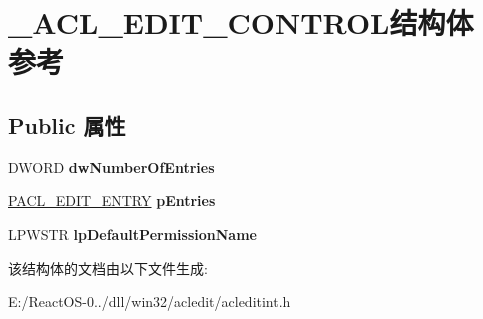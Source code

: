 \hypertarget{struct___a_c_l___e_d_i_t___c_o_n_t_r_o_l}{}\section{\+\_\+\+A\+C\+L\+\_\+\+E\+D\+I\+T\+\_\+\+C\+O\+N\+T\+R\+O\+L结构体 参考}
\label{struct___a_c_l___e_d_i_t___c_o_n_t_r_o_l}
\subsection*{Public 属性}
\begin{DoxyCompactItemize}
\item 
\mbox{\label{struct___a_c_l___e_d_i_t___c_o_n_t_r_o_l_a7f221db0173553a19c20a04e019a44df}} 
D\+W\+O\+RD {\bfseries dw\+Number\+Of\+Entries}
\item 
\mbox{\label{struct___a_c_l___e_d_i_t___c_o_n_t_r_o_l_a7597bfe9c738b44c360315a94d6a4145}} 
\hyperlink{struct___a_c_l___e_d_i_t___e_n_t_r_y}{P\+A\+C\+L\+\_\+\+E\+D\+I\+T\+\_\+\+E\+N\+T\+RY} {\bfseries p\+Entries}
\item 
\mbox{\label{struct___a_c_l___e_d_i_t___c_o_n_t_r_o_l_adca4fda185d6a62bad94fc2adcfc6662}} 
L\+P\+W\+S\+TR {\bfseries lp\+Default\+Permission\+Name}
\end{DoxyCompactItemize}


该结构体的文档由以下文件生成\+:\begin{DoxyCompactItemize}
\item 
E\+:/\+React\+O\+S-\/0../dll/win32/acledit/acleditint.\+h\end{DoxyCompactItemize}
